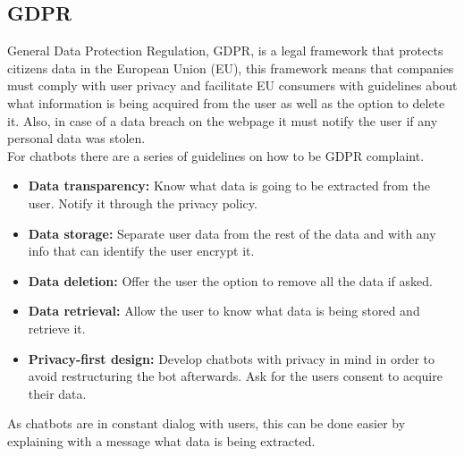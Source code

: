\subsection{GDPR}\label{sec:chap2_gdpr}

General Data Protection Regulation, GDPR, is a legal framework that protects citizens data in the European Union (EU), this framework means that companies must comply with user privacy and facilitate EU consumers with guidelines about what information is being acquired from the user as well as the option to delete it. Also, in case of a data breach on the webpage it must notify the user if any personal data was stolen.\cite{reg-fr-gdpr}\\

For chatbots there are a series of guidelines on how to be GDPR complaint.

\begin{itemize}
	\item \textbf{Data transparency:} Know what data is going to be extracted from the user. Notify it through the privacy policy.
	\item \textbf{Data storage:} Separate user data from the rest of the data and with any info that can identify the user encrypt it.
	\item \textbf{Data deletion:} Offer the user the option to remove all the data if asked.
	\item \textbf{Data retrieval:} Allow the user to know what data is being stored and retrieve it.
	\item \textbf{Privacy-first design:} Develop chatbots with privacy in mind in order to avoid restructuring the bot afterwards.  Ask for the users consent to acquire their data.
\end{itemize}

As chatbots are in constant dialog with users, this can be done easier by explaining with a message what data is being extracted.\cite{reg-fr-gdpr}


